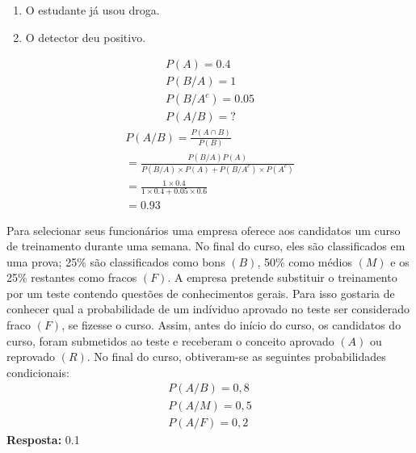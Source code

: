 \begin{description}
\begin{example}
         \begin{enumerate}[label=\Alph*:]
           \item  O estudante já usou droga.
           \item  O detector deu positivo.
         \end{enumerate}
         \begin{align*}
           P(A)= 0.4 \\
           P( B / A )=1 \\
           P(B / A^c) = 0.05\\
           P(A / B)=?
         \end{align*}
         \begin{align*}
           P(A/B)= \frac{P(A \cap B)}{P(B)} \\
           = \frac{P(B/A)P(A)}{P(B/A)\times P(A) + P(B/A^c) \times P(A^c)}\\
           = \frac{1 \times 0.4}{1 \times 0.4 + 0.05 \times 0.6}\\
           =0.93
         \end{align*}
       \end{example}       
       \begin{exercise} Para selecionar seus funcionários uma empresa oferece aos candidatos 
       um curso de treinamento durante uma semana. No final do curso, eles são classificados
       em uma prova; 25\% são classificados como bons $(B)$, 50\% como médios $(M)$ e os 
       25\% restantes como fracos $(F)$. A empresa pretende substituir o treinamento por um teste 
       contendo questões de conhecimentos gerais. Para isso gostaria de conhecer qual a 
       probabilidade de um indíviduo aprovado no teste ser considerado fraco $(F)$, se 
       fizesse o curso. Assim, antes do início do curso, os candidatos do curso, foram 
       submetidos ao teste e receberam o conceito aprovado $(A)$ ou reprovado $(R)$. No final 
       do curso, obtiveram-se as seguintes probabilidades condicionais: 
       \begin{align*}
         P(A/B)= 0,8\\
         P(A/M) = 0,5\\
         P(A/F)=0,2
       \end{align*}
       \textbf{Resposta:} 0.1
     \end{exercise}
   \end{description}
